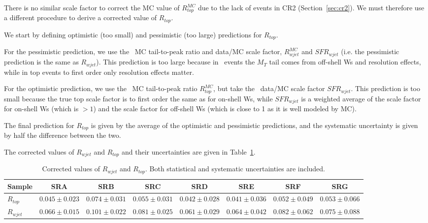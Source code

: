 
There is no similar scale factor to correct the MC value of $R^{MC}_{top}$ due to the lack of events in CR2 (Section~\ref{sec:cr2}).
We must therefore use a different procedure to derive a corrected value of $R_{top}$.

We start by defining optimistic (too small) and pessimistic (too large) predictions for $R_{top}$. 

For the pessimistic prediction, we use the \wjets\ MC tail-to-peak ratio and data/MC scale factor, $R^{MC}_{wjet}$ and $SFR_{wjet}$ (i.e. the pessimistic prediction is the same as $R_{wjet}$).
This prediction is too large because in \wjets\ events the $M_T$ tail comes from
off-shell Ws and resolution effects, while in top events to first order
only resolution effects matter.

For the optimistic prediction, we use the \ttsl\ MC tail-to-peak ratio $R^{MC}_{top}$, but take the \wjets\ data/MC scale factor $SFR_{wjet}$.
This prediction is too small because
the true top scale factor is to first order the same as for on-shell Ws, 
while $SFR_{wjet}$ is a weighted average of the
scale factor for on-shell Ws (which is $>1$) and the
scale factor for off-shell Ws (which is close to 1 as it is well modeled by MC). 

The final prediction for $R_{top}$ is given by the average of the optimistic and pessimistic predictions, and
the systematic uncertainty is given by half the difference between the two.

The corrected values of $R_{wjet}$ and $R_{top}$ and their uncertainties are given in Table~\ref{tab:ttpcorr}.

\begin{table}[!h]
\begin{center}
{\footnotesize
\begin{tabular}{l||c|c|c|c|c|c|c}
\hline
Sample              & SRA & SRB & SRC & SRD & SRE & SRF & SRG\\
\hline
\hline
$R_{top}$ 	  & $0.045 \pm 0.023$  & $0.074 \pm 0.031$  & $0.055 \pm 0.031$  & $0.042 \pm 0.028$  & $0.041 \pm 0.036$  & $0.052 \pm 0.049$  & $0.053 \pm 0.066$  \\
$R_{wjet}$ 	  & $0.066 \pm 0.015$  & $0.101 \pm 0.022$  & $0.081 \pm 0.025$  & $0.061 \pm 0.029$  & $0.064 \pm 0.042$  & $0.082 \pm 0.062$  & $0.075 \pm 0.088$  \\
\hline
\end{tabular}}
\caption{  Corrected values of $R_{wjet}$ and $R_{top}$. Both statistical and systematic uncertainties are included.
\label{tab:ttpcorr}}
\end{center}
\end{table}

\clearpage